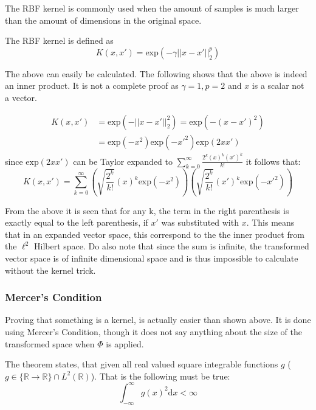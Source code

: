 The RBF kernel is commonly used when the amount of samples is much larger than the amount of dimensions in the original space.

The RBF kernel is defined as
\begin{equation}
K(x,x')=\mathrm{exp}(-\gamma ||x-x'||^p_2)
\end{equation}

The above can easily be calculated. The following shows that the above is indeed an inner product. It is not a complete proof as $\gamma=1, p=2$ and $x$ is a scalar not a vector.

\begin{equation}
\begin{split}
	K(x,x')&=\mathrm{exp}(- ||x-x'||^2_2)=\mathrm{exp}(- (x-x')^2) \\
		  &= \mathrm{exp}(-x^2) \mathrm{exp}(-{x'}^2) \mathrm{exp}(2 x x')
\end{split}
\end{equation}
since $\mathrm{exp}(2 x x')$ can be Taylor expanded to $\sum_{k=0}^\infty \frac{2^k(x)^k (x')^k}{k!}$ it follows that:
\begin{equation}
K(x,x') = \sum_{k=0}^\infty \left(\sqrt{\frac{2^k}{k!}} (x)^k \mathrm{exp}(-x^2)\right)\left(\sqrt{\frac{2^k}{k!}} (x')^k \mathrm{exp}(-{x'}^2)\right)
\end{equation}

From the above it is seen that for any k, the term in the right parenthesis is exactly equal to the left parenthesis, if $x'$ was substituted with $x$. This means that in an expanded vector space, this correspond to the the inner product from the $\ell^2$ Hilbert space. Do also note that since the sum is infinite, the transformed vector space is of infinite dimensional space and is thus impossible to calculate without the kernel trick.

\subsubsection{Mercer's Condition}
Proving that something is a kernel, is actually easier than shown above. It is done using Mercer's Condition, though it does not say anything about the size of the transformed space when $\Phi$ is applied.

The theorem states, that given all real valued square integrable functions $g$ (${g \in \{\mathbb{R} \rightarrow \mathbb{R}\} \cap L^2(\mathbb{R})}$). That is the following must be true:
\begin{equation}
\int_{-\infty}^{\infty} g(x)^2 \mathrm{d}x < \infty
\end{equation}

